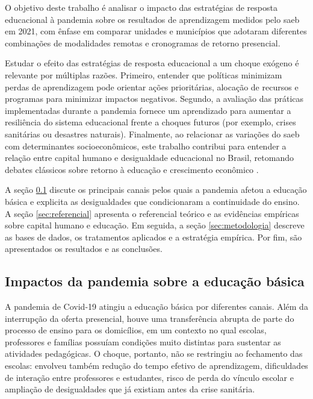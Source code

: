 \documentclass[
	12pt,				%
	openright,			%
	oneside,			%
	a4paper,			%
	brazil,				%
	]{article}
\begin{document}
O objetivo deste trabalho é analisar o impacto das estratégias de resposta
educacional à pandemia sobre os resultados de aprendizagem medidos pelo
\acrshort{saeb} em 2021, com ênfase em comparar unidades e municípios que
adotaram diferentes combinações de modalidades remotas e cronogramas de retorno
presencial.

Estudar o efeito das estratégias de resposta educacional a um choque exógeno é
relevante por múltiplas razões. Primeiro, entender que políticas minimizam
perdas de aprendizagem pode orientar ações prioritárias, alocação de recursos e
programas para minimizar impactos negativos. Segundo, a avaliação das práticas
implementadas durante a pandemia fornece um aprendizado para aumentar a
resiliência do sistema educacional frente a choques futuros (por exemplo, crises
sanitárias ou desastres naturais). Finalmente, ao relacionar as variações do
\acrshort{saeb} com determinantes socioeconômicos, este trabalho contribui para
entender a relação entre capital humano e desigualdade educacional no Brasil,
retomando debates clássicos sobre retorno à educação e crescimento econômico
\cite{Becker1975_HumanCapital,ChavesEtAl2019,FragaBacha2013_AberturaCapitalHumanoCrescimento}.

A seção \ref{sec:impactos-pandemia} discute os principais canais pelos quais a
pandemia afetou a educação básica e explicita as desigualdades que condicionaram
a continuidade do ensino. A seção \ref{sec:referencial} apresenta o referencial
teórico e as evidências empíricas sobre capital humano e educação. Em seguida, a
seção \ref{sec:metodologia} descreve as bases de dados, os tratamentos aplicados
e a estratégia empírica. Por fim, são apresentados os resultados e as
conclusões.

\subsection{Impactos da pandemia sobre a educação básica}
\label{sec:impactos-pandemia}

A pandemia de Covid-19 atingiu a educação básica por diferentes canais. Além da
interrupção da oferta presencial, houve uma transferência abrupta de parte do
processo de ensino para os domicílios, em um contexto no qual escolas,
professores e famílias possuíam condições muito distintas para sustentar as
atividades pedagógicas. O choque, portanto, não se restringiu ao fechamento das
escolas: envolveu também redução do tempo efetivo de aprendizagem, dificuldades
de interação entre professores e estudantes, risco de perda do vínculo escolar
e ampliação de desigualdades que já existiam antes da crise sanitária.
\end{document}

